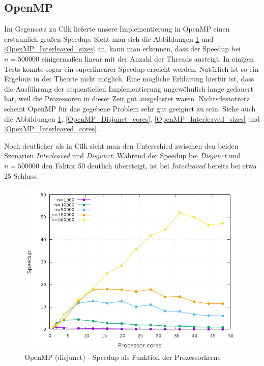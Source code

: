 \subsection{OpenMP}
Im Gegensatz zu Cilk lieferte unsere Implementierung in OpenMP einen erstaunlich großen Speedup.
Sieht man sich die Abbildungen \ref{OpenMP_Disjunct_sizes} und \ref{OpenMP_Interleaved_sizes} an, kann man erkennen, dass der Speedup bei $n = 500000$ einigermaßen linear mit der Anzahl der Threads ansteigt.
In einigen Tests konnte sogar ein superlinearer Speedup erreicht werden.
Natürlich ist so ein Ergebnis in der Theorie nicht möglich.
Eine mögliche Erklärung hierfür ist, dass die Ausführung der sequentiellen Implementierung ungewöhnlich lange gedauert hat, weil die Prozessoren in dieser Zeit gut ausgelastet waren.
Nichtsdestotrotz scheint OpenMP für das gegebene Problem sehr gut geeignet zu sein.
Siehe auch die Abbildungen \ref{OpenMP_Disjunct_sizes}, \ref{OpenMP_Disjunct_cores}, \ref{OpenMP_Interleaved_sizes} und \ref{OpenMP_Interleaved_cores}.

Noch deutlicher als in Cilk sieht man den Unterschied zwischen den beiden Szenarien \emph{Interleaved} und \emph{Disjunct}.
Während der Speedup bei \emph{Disjunct} und $n = 500000$ den Faktor 50 deutlich übersteigt, ist bei \emph{Interleaved} bereits bei etwa 25 Schluss.


\begin{figure}[p]
	\centering
	\includegraphics[width=404pt]{resources/plots/OpenMP_Disjunct_sizes.png}
	\caption{OpenMP (disjunct) - Speedup als Funktion der Prozessorkerne}
	\label{OpenMP_Disjunct_sizes}
\end{figure}

